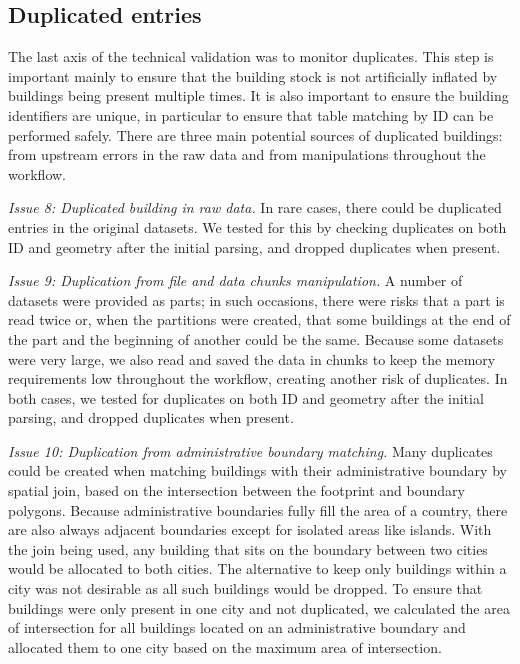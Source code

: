 \documentclass[fleqn,10pt]{wlscirep}
\begin{document}
\subsection*{Duplicated entries}
The last axis of the technical validation was to monitor duplicates. This step is important mainly to ensure that the building stock is not artificially inflated by buildings being present multiple times. It is also important to ensure the building identifiers are unique, in particular to ensure that table matching by ID can be performed safely. There are three main potential sources of duplicated buildings: from upstream errors in the raw data and from manipulations throughout the workflow. 

\medskip \noindent \textit{Issue 8: Duplicated building in raw data.} \hspace{0.1cm}
In rare cases, there could be duplicated entries in the original datasets. We tested for this by checking duplicates on both ID and geometry after the initial parsing, and dropped duplicates when present. 
 
\medskip \noindent \textit{Issue 9: Duplication from file and data chunks manipulation.} \hspace{0.1cm}
A number of datasets were provided as parts; in such occasions, there were risks that a part is read twice or, when the partitions were created, that some buildings at the end of the part and the beginning of another could be the same. Because some datasets were very large, we also read and saved the data in chunks to keep the memory requirements low throughout the workflow, creating another risk of duplicates. In both cases, we tested for duplicates on both ID and geometry after the initial parsing, and dropped duplicates when present.

\medskip \noindent \textit{Issue 10: Duplication from administrative boundary matching.} \hspace{0.1cm} Many duplicates could be created when matching buildings with their administrative boundary by spatial join, based on the intersection between the footprint and boundary polygons. Because administrative boundaries fully fill the area of a country, there are also always adjacent boundaries except for isolated areas like islands. With the join being used, any building that sits on the boundary between two cities would be allocated to both cities. The alternative to keep only buildings within a city was not desirable as all such buildings would be dropped. To ensure that buildings were only present in one city and not duplicated, we calculated the area of intersection for all buildings located on an administrative boundary and allocated them to one city based on the maximum area of intersection. 
\end{document}
